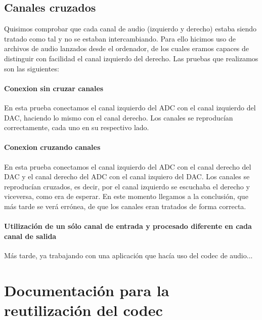 	

	\subsection{Canales cruzados}

		Quisimos comprobar que cada canal de audio (izquierdo y derecho) estaba siendo tratado como tal y no se estaban intercambiando. Para ello hicimos uso de archivos de audio lanzados desde el ordenador, de los cuales eramos capaces de distinguir con facilidad el canal izquierdo del derecho. Las pruebas que realizamos son las siguientes:

		\paragraph{Conexion sin cruzar canales}
			En esta prueba conectamos el canal izquierdo del ADC con el canal izquierdo del DAC, haciendo lo mismo con el canal derecho. Los canales se reproducían correctamente, cada uno en su respectivo lado.


		\paragraph{Conexion cruzando canales}
			En esta prueba conectamos el canal izquierdo del ADC con el canal derecho del DAC y el canal derecho del ADC con el canal izquiero del DAC. Los canales se reproducían cruzados, es decir, por el canal izquierdo se escuchaba el derecho y viceversa, como era de esperar. En este momento llegamos a la conclusión, que más tarde se verá errónea, de que los canales eran tratados de forma correcta.

		\paragraph{Utilización de un sólo canal de entrada y procesado diferente en cada canal de salida}
	
			Más tarde, ya trabajando con una aplicación que hacía uso del codec de audio...
			
		
	
\section{Documentación para la reutilización del codec}
	
